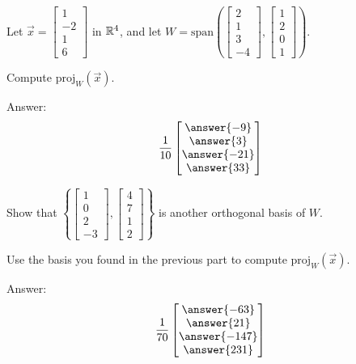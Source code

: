 \documentclass{ximera}
\begin{document}
\begin{problem}\label{OrthoProj1.1}
Let $\vec{x} = \begin{bmatrix}1\\ -2\\ 1\\ 6\end{bmatrix}$ in $\mathbb{R}^4$, and let $W = \mbox{span}\left(\begin{bmatrix}2\\ 1\\ 3\\ -4\end{bmatrix}, \begin{bmatrix}1\\ 2\\ 0\\ 1\end{bmatrix}\right)$.

\begin{question}
Compute $\mbox{proj}_W(\vec{x})$.

Answer:  $$\frac{1}{10}\begin{bmatrix}\answer{-9}\\\answer{3}\\\answer{-21}\\\answer{33}\end{bmatrix}$$
\end{question}

\begin{question}
Show that $\left\{\begin{bmatrix}1\\ 0\\ 2\\ -3\end{bmatrix}, \begin{bmatrix}4\\ 7\\ 1\\ 2\end{bmatrix}\right\}$ is another orthogonal basis of $W$.
\end{question}

\begin{question}
Use the basis you found in the previous part to compute $\mbox{proj}_W(\vec{x})$.

Answer:  $$\frac{1}{70}\begin{bmatrix}\answer{-63}\\\answer{21}\\\answer{-147}\\\answer{231}\end{bmatrix}$$
\end{question}
\end{problem}
\end{document}
